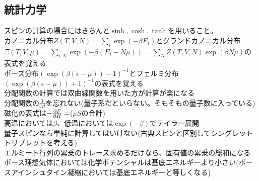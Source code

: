 \documentclass{ltjsarticle}
\begin{document}
  \subsection{統計力学}
  スピンの計算の場合にはきちんと$\sinh,\cosh,\tanh$を用いること。\\
  カノニカル分布$Z(T,V,N)=\sum_i \exp(-\beta E_i)$とグランドカノニカル分布$\Xi(T,V,\mu)=\sum_{i,N}\exp(-\beta(E_i-N\mu))=\sum_N Z(T,V,N)\exp(\beta N\mu)$の表式を覚える\\
  ボーズ分布$(\exp(\beta(\epsilon-\mu))-1)^{-1}$とフェルミ分布$(\exp(\beta(\epsilon-\mu))+1)^{-1}$の表式を覚える\\
  分配関数の計算では双曲線関数を用いた方が計算が楽になる\\
  分配関数の$\frac{1}{N!}$を忘れない(量子系だといらない。そもそもの量子数に入っている)\\
  磁化の表式は$-\pdv{F}{H}=$($\mu S$の合計)\\
  高温においては$\beta$、低温においては$\exp(-\beta)$でテイラー展開\\
  量子スピンなら単純に計算してはいけない(古典スピンと区別してシングレットトリプレットを考える)\\
  エルミート行列の累乗のトレース求めるだけなら、固有値の累乗の総和になる\\
  ボース理想気体においては化学ポテンシャルは基底エネルギーより小さい(ボースアインシュタイン凝縮においては基底エネルギーと等しくなる)\\
\end{document}
